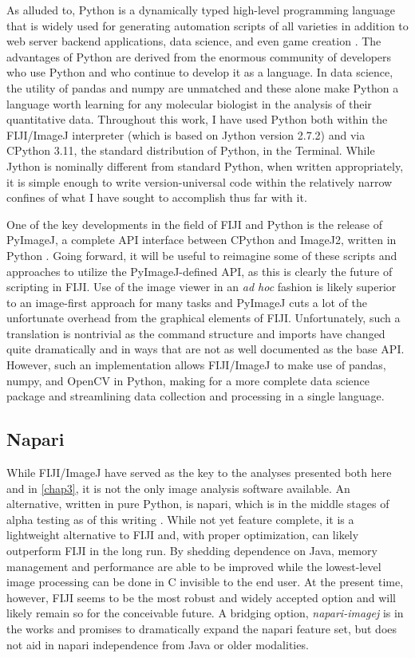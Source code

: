 As alluded to, Python is a dynamically typed high\hyp{}level programming language that is widely used for generating automation scripts of all varieties in addition to web server backend applications, data science, and even game creation \citep{vanRossum1995}. The advantages of Python are derived from the enormous community of developers who use Python and who continue to develop it as a language. In data science, the utility of pandas and numpy are unmatched and these alone make Python a language worth learning for any molecular biologist in the analysis of their quantitative data. Throughout this work, I have used Python both within the FIJI/ImageJ interpreter (which is based on Jython version 2.7.2) and via CPython 3.11, the standard distribution of Python, in the Terminal. While Jython is nominally different from standard Python, when written appropriately, it is simple enough to write version\hyp{}universal code within the relatively narrow confines of what I have sought to accomplish thus far with it.

One of the key developments in the field of FIJI and Python is the release of PyImageJ, a complete API interface between CPython and ImageJ2, written in Python \citep{Rueden2022}. Going forward, it will be useful to reimagine some of these scripts and approaches to utilize the PyImageJ\hyp{}defined API, as this is clearly the future of scripting in FIJI. Use of the image viewer in an \textit{ad hoc} fashion is likely superior to an image\hyp{}first approach for many tasks and PyImageJ cuts a lot of the unfortunate overhead from the graphical elements of FIJI. Unfortunately, such a translation is nontrivial as the command structure and imports have changed quite dramatically and in ways that are not as well documented as the base API. However, such an implementation allows FIJI/ImageJ to make use of pandas, numpy, and OpenCV in Python, making for a more complete data science package and streamlining data collection and processing in a single language. 

\subsection{Napari}

While FIJI/ImageJ have served as the key to the analyses presented both here and in \autoref{chap3}, it is not the only image analysis software available. An alternative, written in pure Python, is napari, which is in the middle stages of alpha testing as of this writing \citep{napari}. While not yet feature complete, it is a lightweight alternative to FIJI and, with proper optimization, can likely outperform FIJI in the long run. By shedding dependence on Java, memory management and performance are able to be improved while the lowest\hyp{}level image processing can be done in C invisible to the end user. At the present time, however, FIJI seems to be the most robust and widely accepted option and will likely remain so for the conceivable future. A bridging option, \textit{napari\hyp{}imagej} is in the works and promises to dramatically expand the napari feature set, but does not aid in napari independence from Java or older modalities.

